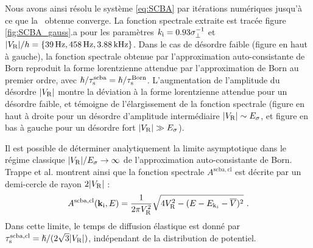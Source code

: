 Nous avons ainsi résolu le système \ref{eq:SCBA} par itérations numériques jusqu'à ce que la \selfenergy\ obtenue converge. La fonction spectrale extraite est tracée figure \ref{fig:SCBA_gauss}.a pour les paramètres $k_{\mathrm{i}}=0.93\sigma_{\perp}^{-1}$ et $|V_{\mathrm{R}}|/h=\lbrace \SI{39}{\hertz},\SI{458}{\hertz},\SI{3.88}{\kilo\hertz}\rbrace$. Dans le cas de désordre faible (figure en haut à gauche), la fonction spectrale obtenue par l'approximation auto-consistante de Born reproduit la forme lorentzienne attendue par l'approximation de Born au premier ordre, avec $\hslash/\tau_{\mathrm{s}}^{\mathrm{scba}}=\hslash/\tau_{\mathrm{s}}^{\mathrm{Born}}$. L'augmentation de l'amplitude du désordre $|V_{\mathrm{R}}|$ montre la déviation à la forme lorentzienne attendue pour un désordre faible, et témoigne de l'élargissement de la fonction spectrale (figure en haut à droite pour un désordre d'amplitude intermédiaire $|V_{\mathrm{R}}|\sim E_{\sigma}$, et figure en bas à gauche pour un désordre fort $|V_{\mathrm{R}}|\gg E_{\sigma}$).

Il est possible de déterminer analytiquement la limite asymptotique dans le régime classique $|V_{\mathrm{R}}|/E_{\sigma}\rightarrow\infty$ de l'approximation auto-consistante de Born. Trappe et al. montrent ainsi que la fonction spectrale $A^{\mathrm{scba,cl}}$ est décrite par un demi-cercle de rayon $2|V_{\mathrm{R}}|$ \citep{trappe2015semiclassical}:
\begin{equation}
A^{\mathrm{scba,cl}}(\mathbf{k}_{\mathrm{i}},E)=\frac{1}{2\pi V_{\mathrm{R}}^2} \sqrt{4V_{\mathrm{R}}^2-(E-E_{\mathrm{k}_i}-\overline{V})^2} \text{ .}
\end{equation}
Dans cette limite, le temps de diffusion élastique est donné par $\tau_{\mathrm{s}}^{\mathrm{scba,cl}}=\hslash/(2\sqrt{3}|V_{\mathrm{R}}|)$, indépendant de la distribution de potentiel. 

